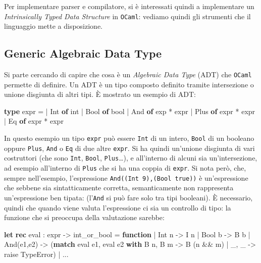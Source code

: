 \documentclass[]{article}
\newenvironment{Shaded}{}{}
\newcommand{\DataTypeTok}[1]{\textcolor[rgb]{0.56,0.13,0.00}{#1}}
\newcommand{\KeywordTok}[1]{\textcolor[rgb]{0.00,0.44,0.13}{\textbf{#1}}}
\newcommand{\NormalTok}[1]{#1}
\begin{document}
Per implementare parser e compilatore, si è interessati quindi a
implementare un \emph{Intrinsically Typed Data Structure} in
\texttt{OCaml}: vediamo quindi gli strumenti che il linguaggio mette a
disposizione.

\hypertarget{generic-algebraic-data-type}{%
\subsection{Generic Algebraic Data
Type}\label{generic-algebraic-data-type}}

Si parte cercando di capire che cosa è un \emph{Algebraic Data Type}
(ADT) che \texttt{OCaml} permette di definire. Un ADT è un tipo composto
definito tramite intersezione o unione disgiunta di altri tipi. È
mostrato un esempio di ADT:

\begin{Shaded}
\begin{Highlighting}[]
\KeywordTok{type}\NormalTok{ expr =}
\NormalTok{ | Int }\KeywordTok{of} \DataTypeTok{int}
\NormalTok{ | Bool }\KeywordTok{of} \DataTypeTok{bool}
\NormalTok{ | And }\KeywordTok{of} \DataTypeTok{exp}\NormalTok{ * expr}
\NormalTok{ | Plus }\KeywordTok{of}\NormalTok{ expr * expr }
\NormalTok{ | Eq }\KeywordTok{of}\NormalTok{ expr * expr}
\end{Highlighting}
\end{Shaded}

In questo esempio un tipo \texttt{expr} può essere \texttt{Int} di un
intero, \texttt{Bool} di un booleano oppure \texttt{Plus}, \texttt{And}
o \texttt{Eq} di due altre \texttt{expr}. Si ha quindi un'unione
disgiunta di vari costruttori (che sono \texttt{Int}, \texttt{Bool},
\texttt{Plus}\ldots{}), e all'interno di alcuni sia un'intersezione, ad
esempio all'interno di \texttt{Plus} che si ha una coppia di
\texttt{expr}. Si nota però, che, sempre nell'esempio, l'espressione
\texttt{And((Int\ 9),(Bool\ true))} è un'espressione che sebbene sia
sintatticamente corretta, semanticamente non rappresenta un'espressione
ben tipata: (l'\texttt{And} si può fare solo tra tipi booleani). È
necessario, quindi che quando viene valuta l'espressione ci sia un
controllo di tipo: la funzione che si preoccupa della valutazione
sarebbe:

\begin{Shaded}
\begin{Highlighting}[]
\KeywordTok{let} \KeywordTok{rec}\NormalTok{ eval : expr -> int_or_bool =}
\KeywordTok{function}
\NormalTok{ | Int n -> I n}
\NormalTok{ | Bool b -> B b}
\NormalTok{ | And(e1,e2) ->}
\NormalTok{ (}\KeywordTok{match}\NormalTok{ eval e1, eval e2 }\KeywordTok{with}
\NormalTok{    B n, B m -> B (n && m)}
\NormalTok{    | _, _ -> }\DataTypeTok{raise}\NormalTok{ TypeError)}
\NormalTok{ | ... }
\end{Highlighting}
\end{Shaded}
\end{document}
